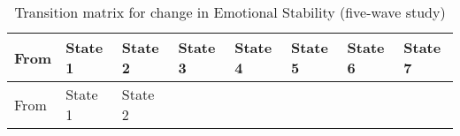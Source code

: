 \documentclass[
  single column]{article}
\begin{document}
\begin{longtable}[]{@{}
  >{\centering\arraybackslash}p{}
  >{\centering\arraybackslash}p{}
  >{\centering\arraybackslash}p{}
  >{\centering\arraybackslash}p{}
  >{\centering\arraybackslash}p{}
  >{\centering\arraybackslash}p{}
  >{\centering\arraybackslash}p{}
  >{\centering\arraybackslash}p{}@{}}
\caption{Transition matrix for change in Emotional Stability (five-wave
study)}\label{tbl-table-transition-emotional_stability-long}\tabularnewline
\toprule\noalign{}
\begin{minipage}[b]{\linewidth}\centering
From
\end{minipage} & \begin{minipage}[b]{\linewidth}\centering
State 1
\end{minipage} & \begin{minipage}[b]{\linewidth}\centering
State 2
\end{minipage} & \begin{minipage}[b]{\linewidth}\centering
State 3
\end{minipage} & \begin{minipage}[b]{\linewidth}\centering
State 4
\end{minipage} & \begin{minipage}[b]{\linewidth}\centering
State 5
\end{minipage} & \begin{minipage}[b]{\linewidth}\centering
State 6
\end{minipage} & \begin{minipage}[b]{\linewidth}\centering
State 7
\end{minipage} \\
\midrule\noalign{}
\endfirsthead
\toprule\noalign{}
\begin{minipage}[b]{\linewidth}\centering
From
\end{minipage} & \begin{minipage}[b]{\linewidth}\centering
State 1
\end{minipage} & \begin{minipage}[b]{\linewidth}\centering
State 2
\end{minipage} & \begin{minipage}[b]{\linewidth}\centering

\end{minipage}
\end{longtable}
\end{document}
